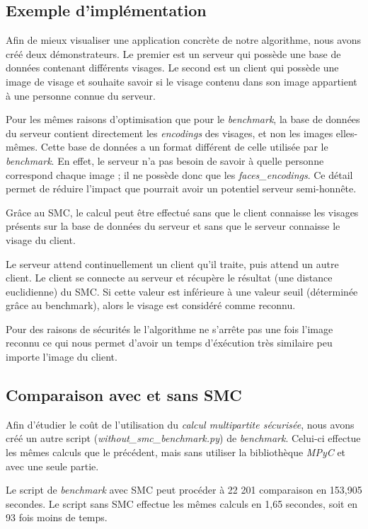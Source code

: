\documentclass[12pt,a4paper]{article}
\begin{document}
\subsection{Exemple d'implémentation}
Afin de mieux visualiser une application concrète de notre algorithme, nous avons créé deux démonstrateurs. Le premier est un serveur qui possède une base de données contenant différents visages. Le second est un client qui possède une image de visage et souhaite savoir si le visage contenu dans son image appartient à une personne connue du serveur.

Pour les mêmes raisons d'optimisation que pour le \textit{benchmark}, la base de données du serveur contient directement les \textit{encodings} des visages, et non les images elles-mêmes. Cette base de données a un format différent de celle utilisée par le \textit{benchmark}. En effet, le serveur n'a pas besoin de savoir à quelle personne correspond chaque image ; il ne possède donc que les \textit{faces\_encodings}. Ce détail permet de réduire l'impact que pourrait avoir un potentiel serveur semi-honnête.

Grâce au SMC, le calcul peut être effectué sans que le client connaisse les visages présents sur la base de données du serveur et sans que le serveur connaisse le visage du client.

Le serveur attend continuellement un client qu'il traite, puis attend un autre client. Le client se connecte au serveur et récupère le résultat (une distance euclidienne) du SMC. Si cette valeur est inférieure à une valeur seuil (déterminée grâce au benchmark), alors le visage est considéré comme reconnu.

Pour des raisons de sécurités le l'algorithme ne s'arrête pas une fois l'image reconnu ce qui nous permet d'avoir un temps d'éxécution très similaire peu importe l'image du client.
\subsection{Comparaison avec et sans SMC}
Afin d'étudier le coût de l'utilisation du \textit{calcul multipartite sécurisée}, nous avons créé un autre script (\textit{without\_smc\_benchmark.py}) de \textit{benchmark}. Celui-ci effectue les mêmes calculs que le précédent, mais sans utiliser la bibliothèque \textit{MPyC} et avec une seule partie.

Le script de \textit{benchmark} avec SMC peut procéder à 22 201 comparaison en 153,905 secondes. Le script sans SMC effectue les mêmes calculs en 1,65 secondes, soit en 93 fois moins de temps.
\end{document}
